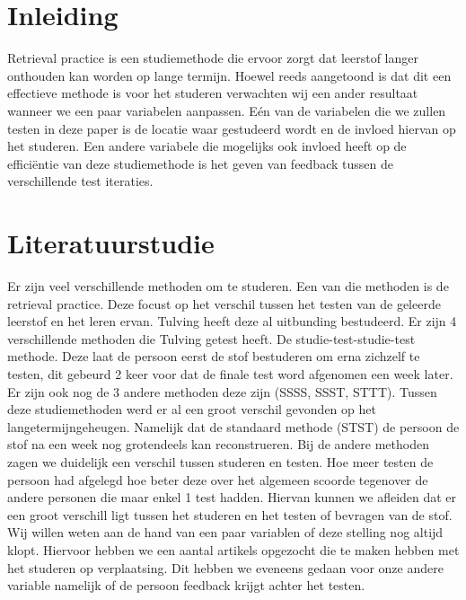 \documentclass{hogent-article}
\affiliation{
	\textsuperscript{1} \href{mailto:Olivier.troch.w2257@student.hogent.be}{Olivier.troch.w2257@student.hogent.be}
}
\affiliation{
	\textsuperscript{2} \href{mailto:daan.vanvooren.y1502@student.hogent.be}{daan.vanvooren.y1502@student.hogent.be}
}
\affiliation{
	\textsuperscript{3}
	\href{mailto:robbie.verdurme.y9234@student.hogent.be}{robbie.verdurme.y9234@student.hogent.be}
}
\affiliation{
	\textsuperscript{4}
	\href{mailto;sebastien.wojtyla.y3274@student.hogent.be}{sebastien.wojtyla.y3274@student.hogent.be}
}
\begin{document}
	
	\flushbottom %
	\maketitle %
	\tableofcontents %
	\thispagestyle{empty} %
	
	
	\section{Inleiding}
	Retrieval practice is een studiemethode die ervoor zorgt dat leerstof langer onthouden kan worden op lange termijn. Hoewel reeds aangetoond is dat dit een effectieve methode is voor het studeren verwachten wij een ander resultaat wanneer we een paar variabelen aanpassen. Eén van de variabelen die we zullen testen in deze paper is de locatie waar gestudeerd wordt en de invloed hiervan op het studeren. 
	Een andere variabele die mogelijks ook invloed heeft op de efficiëntie van deze studiemethode is het geven van feedback tussen de verschillende test iteraties.
	
	\section{Literatuurstudie}
	Er zijn veel verschillende methoden om te studeren. Een van die methoden is de retrieval practice. Deze focust op het verschil tussen het testen van de geleerde leerstof en het leren ervan.
	Tulving \autocite{karpicke2008critical, karpicke2009metacognitive ,karpicke2007repeated} heeft deze al uitbunding bestudeerd. Er zijn 4 verschillende methoden die Tulving getest heeft. De studie-test-studie-test methode. Deze laat de persoon eerst de stof bestuderen om erna zichzelf te testen, dit gebeurd 2 keer voor dat de finale test word afgenomen een week later. Er zijn ook nog de 3 andere methoden deze zijn (SSSS, SSST, STTT).
	Tussen deze studiemethoden werd er al een groot verschil gevonden op het langetermijngeheugen. Namelijk dat de standaard methode (STST) de persoon de stof na een week nog grotendeels kan reconstrueren. Bij de andere methoden zagen we duidelijk een verschil tussen studeren en testen. Hoe meer testen de persoon had afgelegd hoe beter deze over het algemeen scoorde tegenover de andere personen die maar enkel 1 test hadden. Hiervan kunnen we afleiden dat er een groot verschill ligt tussen het studeren en het testen of bevragen van de stof.
	Wij willen weten aan de hand van een paar variablen of deze stelling nog altijd klopt. Hiervoor hebben we een aantal artikels opgezocht die te maken hebben met het studeren op verplaatsing. Dit hebben we eveneens gedaan voor onze andere variable namelijk of de persoon feedback krijgt achter het testen.
    
\end{document}
